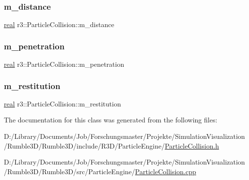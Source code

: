 \subsubsection{\texorpdfstring{m\+\_\+distance}{m\_distance}}
{\footnotesize\ttfamily \mbox{\hyperlink{namespacer3_ab2016b3e3f743fb735afce242f0dc1eb}{real}} r3\+::\+Particle\+Collision\+::m\+\_\+distance\hspace{0.3cm}{\ttfamily [protected]}}

\mbox{\label{classr3_1_1_particle_collision_a4e27e43b9a17e4a1d04ff91b808b4da9}} 
\subsubsection{\texorpdfstring{m\+\_\+penetration}{m\_penetration}}
{\footnotesize\ttfamily \mbox{\hyperlink{namespacer3_ab2016b3e3f743fb735afce242f0dc1eb}{real}} r3\+::\+Particle\+Collision\+::m\+\_\+penetration\hspace{0.3cm}{\ttfamily [protected]}}

\mbox{\label{classr3_1_1_particle_collision_a02dd7e5f227a429bcb707ad46adeb292}} 
\subsubsection{\texorpdfstring{m\+\_\+restitution}{m\_restitution}}
{\footnotesize\ttfamily \mbox{\hyperlink{namespacer3_ab2016b3e3f743fb735afce242f0dc1eb}{real}} r3\+::\+Particle\+Collision\+::m\+\_\+restitution\hspace{0.3cm}{\ttfamily [protected]}}



The documentation for this class was generated from the following files\+:\begin{DoxyCompactItemize}
\item 
D\+:/\+Library/\+Documents/\+Job/\+Forschungsmaster/\+Projekte/\+Simulation\+Visualization/\+Rumble3\+D/\+Rumble3\+D/include/\+R3\+D/\+Particle\+Engine/\mbox{\hyperlink{_particle_collision_8h}{Particle\+Collision.\+h}}\item 
D\+:/\+Library/\+Documents/\+Job/\+Forschungsmaster/\+Projekte/\+Simulation\+Visualization/\+Rumble3\+D/\+Rumble3\+D/src/\+Particle\+Engine/\mbox{\hyperlink{_particle_collision_8cpp}{Particle\+Collision.\+cpp}}\end{DoxyCompactItemize}

